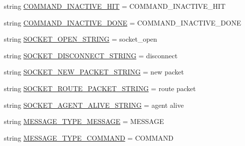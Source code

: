\begin{DoxyCompactItemize}
\item 
string \hyperlink{namespaceparlai_1_1mturk_1_1core_1_1legacy__2018_1_1data__model_a99a3ad0baa14c7ab4f9e0743e5f23d8b}{C\+O\+M\+M\+A\+N\+D\+\_\+\+I\+N\+A\+C\+T\+I\+V\+E\+\_\+\+H\+IT} = \textquotesingle{}C\+O\+M\+M\+A\+N\+D\+\_\+\+I\+N\+A\+C\+T\+I\+V\+E\+\_\+\+H\+IT\textquotesingle{}
\item 
string \hyperlink{namespaceparlai_1_1mturk_1_1core_1_1legacy__2018_1_1data__model_aa209d060e0c7dfc31d805b444ac460b3}{C\+O\+M\+M\+A\+N\+D\+\_\+\+I\+N\+A\+C\+T\+I\+V\+E\+\_\+\+D\+O\+NE} = \textquotesingle{}C\+O\+M\+M\+A\+N\+D\+\_\+\+I\+N\+A\+C\+T\+I\+V\+E\+\_\+\+D\+O\+NE\textquotesingle{}
\item 
string \hyperlink{namespaceparlai_1_1mturk_1_1core_1_1legacy__2018_1_1data__model_a450543403314ab4c3d72fa1f1648797e}{S\+O\+C\+K\+E\+T\+\_\+\+O\+P\+E\+N\+\_\+\+S\+T\+R\+I\+NG} = \textquotesingle{}socket\+\_\+open\textquotesingle{}
\item 
string \hyperlink{namespaceparlai_1_1mturk_1_1core_1_1legacy__2018_1_1data__model_a36b22a89ffff8dace67fdd4f44dd4ac3}{S\+O\+C\+K\+E\+T\+\_\+\+D\+I\+S\+C\+O\+N\+N\+E\+C\+T\+\_\+\+S\+T\+R\+I\+NG} = \textquotesingle{}disconnect\textquotesingle{}
\item 
string \hyperlink{namespaceparlai_1_1mturk_1_1core_1_1legacy__2018_1_1data__model_a97d4cdda5406b9d2b065509323d0088d}{S\+O\+C\+K\+E\+T\+\_\+\+N\+E\+W\+\_\+\+P\+A\+C\+K\+E\+T\+\_\+\+S\+T\+R\+I\+NG} = \textquotesingle{}new packet\textquotesingle{}
\item 
string \hyperlink{namespaceparlai_1_1mturk_1_1core_1_1legacy__2018_1_1data__model_abfbc4250c2777bc3bc6d9e1d748d7555}{S\+O\+C\+K\+E\+T\+\_\+\+R\+O\+U\+T\+E\+\_\+\+P\+A\+C\+K\+E\+T\+\_\+\+S\+T\+R\+I\+NG} = \textquotesingle{}route packet\textquotesingle{}
\item 
string \hyperlink{namespaceparlai_1_1mturk_1_1core_1_1legacy__2018_1_1data__model_af2497671e70bfce36b39b4b5a88e978f}{S\+O\+C\+K\+E\+T\+\_\+\+A\+G\+E\+N\+T\+\_\+\+A\+L\+I\+V\+E\+\_\+\+S\+T\+R\+I\+NG} = \textquotesingle{}agent alive\textquotesingle{}
\item 
string \hyperlink{namespaceparlai_1_1mturk_1_1core_1_1legacy__2018_1_1data__model_a888ff14bd7dc98e6266edf4f3cb725aa}{M\+E\+S\+S\+A\+G\+E\+\_\+\+T\+Y\+P\+E\+\_\+\+M\+E\+S\+S\+A\+GE} = \textquotesingle{}M\+E\+S\+S\+A\+GE\textquotesingle{}
\item 
string \hyperlink{namespaceparlai_1_1mturk_1_1core_1_1legacy__2018_1_1data__model_a6acb9cb225ff8fc95f1db5e7b30fcb2a}{M\+E\+S\+S\+A\+G\+E\+\_\+\+T\+Y\+P\+E\+\_\+\+C\+O\+M\+M\+A\+ND} = \textquotesingle{}C\+O\+M\+M\+A\+ND\textquotesingle{}
\end{DoxyCompactItemize}


